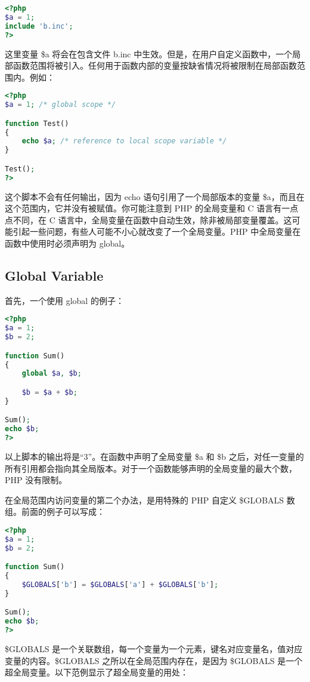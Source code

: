 \begin{lstlisting}[language=PHP]
<?php
$a = 1;
include 'b.inc';
?>
\end{lstlisting}

这里变量 \$a 将会在包含文件 b.inc 中生效。但是，在用户自定义函数中，一个局部函数范围将被引入。任何用于函数内部的变量按缺省情况将被限制在局部函数范围内。例如：

\begin{lstlisting}[language=PHP]
<?php
$a = 1; /* global scope */

function Test()
{
    echo $a; /* reference to local scope variable */
}

Test();
?>
\end{lstlisting}

这个脚本不会有任何输出，因为 echo 语句引用了一个局部版本的变量 \$a，而且在这个范围内，它并没有被赋值。你可能注意到 PHP 的全局变量和 C 语言有一点点不同，在 C 语言中，全局变量在函数中自动生效，除非被局部变量覆盖。这可能引起一些问题，有些人可能不小心就改变了一个全局变量。PHP 中全局变量在函数中使用时必须声明为 global。


\subsection{Global Variable}


首先，一个使用 global 的例子：


\begin{lstlisting}[language=PHP]
<?php
$a = 1;
$b = 2;

function Sum()
{
    global $a, $b;

    $b = $a + $b;
}

Sum();
echo $b;
?>
\end{lstlisting}

以上脚本的输出将是“3”。在函数中声明了全局变量 \$a 和 \$b 之后，对任一变量的所有引用都会指向其全局版本。对于一个函数能够声明的全局变量的最大个数，PHP 没有限制。

在全局范围内访问变量的第二个办法，是用特殊的 PHP 自定义 \$GLOBALS 数组。前面的例子可以写成：



\begin{lstlisting}[language=PHP]
<?php
$a = 1;
$b = 2;

function Sum()
{
    $GLOBALS['b'] = $GLOBALS['a'] + $GLOBALS['b'];
}

Sum();
echo $b;
?>
\end{lstlisting}

\$GLOBALS 是一个关联数组，每一个变量为一个元素，键名对应变量名，值对应变量的内容。\$GLOBALS 之所以在全局范围内存在，是因为 \$GLOBALS 是一个超全局变量。以下范例显示了超全局变量的用处：



